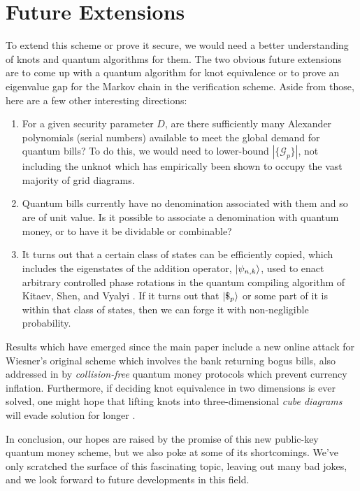 \section{Future Extensions}

To extend this scheme or prove it secure, we would need a better
understanding of knots and quantum algorithms for them. The
two obvious future extensions are to come up with a quantum algorithm
for knot equivalence or
to prove an eigenvalue gap for the Markov chain in the verification
scheme. Aside from those, here are a
few other interesting directions:

\begin{enumerate}
\item
For a given security parameter $D$, 
are there sufficiently many Alexander polynomials (serial numbers)
available to meet the global demand for quantum bills?
To do this, we would need to lower-bound $|\{\mathcal{G}_p\}|$,
not including the unknot which has empirically been shown
to
occupy the vast majority of grid diagrams.
\item
Quantum bills currently have no denomination associated with
them and so are of unit value.
Is it possible to associate a denomination with quantum money, or to have
it be dividable or combinable?
\item 
It turns out that a certain class of states can be efficiently copied, which
includes the eigenstates of the addition operator, $|\psi_{n,k} \rangle$,
used to enact arbitrary controlled phase
rotations in the quantum compiling algorithm of Kitaev, Shen, and Vyalyi
\cite{KSV02}.
If it turns out that $|\$_p \rangle$ or some part of it is
within that class of states, then we can forge it with non-negligible
probability.
\end{enumerate}

Results which have emerged since the main paper \cite{Farhi2010}
include a new online attack for Wiesner's original scheme
which involves the bank returning bogus bills,
also addressed in \cite{Lutomirski2010} by 
\emph{collision-free} quantum money
protocols which prevent currency inflation.
Furthermore, if deciding knot equivalence in two dimensions is ever
solved, one might hope that lifting knots into
three-dimensional \emph{cube diagrams}
will evade solution for longer \cite{Baldridge2009}.

In conclusion, our hopes are raised by the promise of
this new public-key quantum money scheme, but we also poke at some of
its shortcomings. We've only scratched the surface of this fascinating
topic, leaving out many bad jokes, and
we look forward to future developments in this field.
